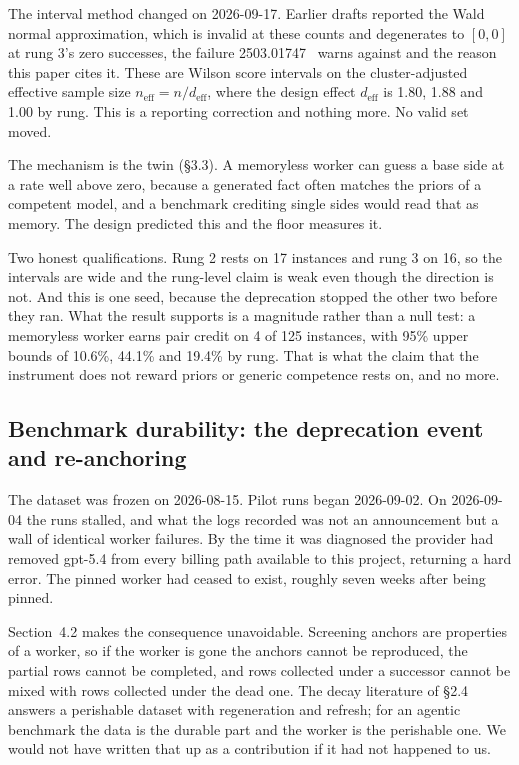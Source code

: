 \documentclass[11pt]{article}
\begin{document}
The interval method changed on 2026-09-17. Earlier drafts reported the Wald
normal approximation, which is invalid at these counts and degenerates to
$[0,0]$ at rung 3's zero successes, the failure 2503.01747~\cite{bowyer} warns
against and the reason this paper cites it. These are Wilson score intervals on
the cluster-adjusted effective sample size $n_{\mathrm{eff}} = n/d_{\mathrm{eff}}$,
where the design effect $d_{\mathrm{eff}}$ is 1.80, 1.88 and 1.00 by rung. This is
a reporting correction and nothing more. No valid set moved.

The mechanism is the twin (\S3.3). A memoryless worker can guess a base side at a
rate well above zero, because a generated fact often matches the priors of a
competent model, and a benchmark crediting single sides would read that as
memory. The design predicted this and the floor measures it.

Two honest qualifications. Rung 2 rests on 17 instances and rung 3 on 16, so the
intervals are wide and the rung-level claim is weak even though the direction is
not. And this is one seed, because the deprecation stopped the other two before
they ran. What the result supports is a magnitude rather than a null test: a
memoryless worker earns pair credit on 4 of 125 instances, with 95\% upper bounds
of 10.6\%, 44.1\% and 19.4\% by rung. That is what the claim that the instrument
does not reward priors or generic competence rests on, and no more.

\subsection{Benchmark durability: the deprecation event and re-anchoring}

The dataset was frozen on 2026-08-15. Pilot runs began 2026-09-02. On 2026-09-04
the runs stalled, and what the logs recorded was not an announcement but a wall
of identical worker failures. By the time it was diagnosed the provider had
removed gpt-5.4 from every billing path available to this project, returning a
hard error. The pinned worker had ceased to exist, roughly seven weeks after
being pinned.

Section~4.2 makes the consequence unavoidable. Screening anchors are properties
of a worker, so if the worker is gone the anchors cannot be reproduced, the
partial rows cannot be completed, and rows collected under a successor cannot be
mixed with rows collected under the dead one. The decay literature of \S2.4
answers a perishable dataset with regeneration and refresh; for an agentic
benchmark the data is the durable part and the worker is the perishable one. We
would not have written that up as a contribution if it had not happened to us.
\end{document}
